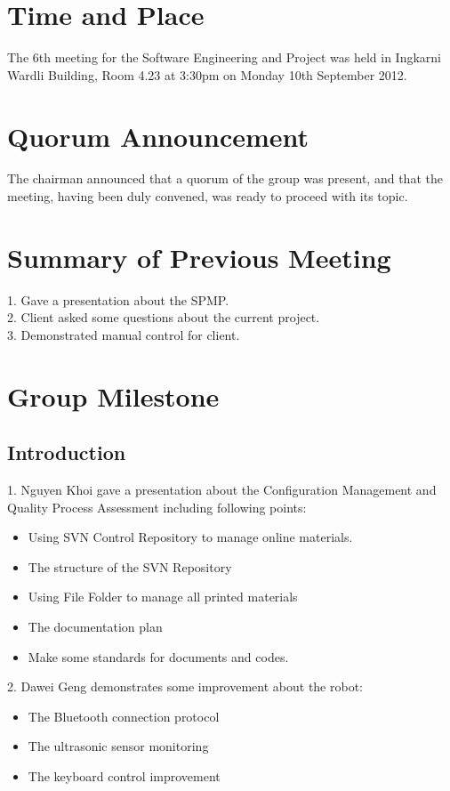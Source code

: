 \documentclass[11pt, a4paper]{article}
\begin{document}
\section{Time and Place}
The 6th meeting for the Software Engineering and Project was held in Ingkarni Wardli Building, Room     4.23 at 3:30pm on Monday 10th September 2012.

\section{Quorum Announcement}
The chairman announced that a quorum of the group was present, and that the meeting, having been duly convened, was ready to proceed with its topic.

\section{Summary of Previous Meeting}
1. Gave a presentation about the SPMP.\\
2. Client asked some questions about the current project.\\
3. Demonstrated manual control for client.\\ 

\section{Group Milestone}

\subsection{Introduction}
1. Nguyen Khoi gave a presentation about the Configuration Management and Quality Process Assessment including following points:
\begin{itemize}
\item Using SVN Control Repository to manage online materials.
\item The structure of the SVN Repository
\item Using File Folder to manage all printed materials
\item The documentation plan
\item Make some standards for documents and codes. 
\end{itemize}
2. Dawei Geng demonstrates some improvement about the robot:
\begin{itemize}
\item The Bluetooth connection protocol
\item The ultrasonic sensor monitoring
\item The keyboard control improvement
\end{itemize}
\end{document}
